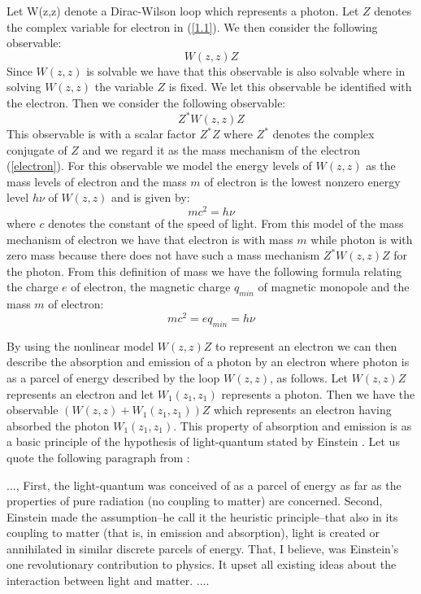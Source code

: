 \documentclass[a4paper,a4paper]{article}
\begin{document}
Let W(z,z) denote a Dirac-Wilson loop which represents a photon. Let
$Z$ denotes the complex variable for electron in (\ref{1.1}). We then consider the following observable:
\begin{equation}
 W(z,z)Z
\label{electron}
\end{equation}
Since $W(z,z)$ is solvable we have that this observable is also solvable where in solving $W(z,z)$ the variable $Z$ is fixed. We let this observable be identified with the electron. Then we consider the following observable:
\begin{equation}
 Z^* W(z,z)Z
\label{electron1}
\end{equation}
This observable is with a scalar factor $Z^* Z$ where $Z^*$ denotes the complex conjugate of $Z$ and we regard it as the mass mechanism of the electron (\ref{electron}). For this observable we model the energy levels of $W(z,z)$ as the mass levels of electron and the mass $m$ of electron is the lowest nonzero energy level $h\nu$ of $W(z,z)$ and is given by:
\begin{equation}
 mc^2=h\nu
\label{electron2}
\end{equation}
where $c$ denotes the constant of the speed of light. From this model of the mass mechanism of electron we have that electron is with mass $m$ while photon is with zero mass because there does not have such a mass mechanism $Z^* W(z,z)Z$ for the photon. From this definition of mass we have the following formula relating the charge $e$ of electron, the magnetic charge $q_{min}$ of magnetic monopole and the mass $m$ of electron:
\begin{equation}
 mc^2= e q_{min}=h\nu
\label{electron3}
\end{equation}

By using the nonlinear model $W(z,z)Z$ to represent an electron we can then describe the absorption and emission of a photon by an electron where photon is as a parcel of energy described by the loop $W(z,z)$, as follows. Let $W(z,z)Z$ represents an electron and let $W_1(z_1,z_1)$ represents a photon. Then we have the observable $(W(z,z)+W_1(z_1,z_1))Z$ which represents an electron having absorbed the photon $W_1(z_1,z_1)$. This property of absorption and emission is as a basic principle of the hypothesis of light-quantum stated by Einstein \cite{Pai}. Let us quote the following paragraph from \cite{Pai}:

..., First, the light-quantum was conceived of as a parcel of energy as far as the properties of pure radiation (no coupling to matter) are concerned. Second, Einstein made the assumption--he call it the heuristic principle--that also in its coupling to matter (that is, in emission and absorption), light is created or annihilated in similar discrete parcels of energy. That, I believe, was Einstein's one revolutionary contribution to physics. It upset all existing ideas about the interaction between light and matter. ....
\end{document}
